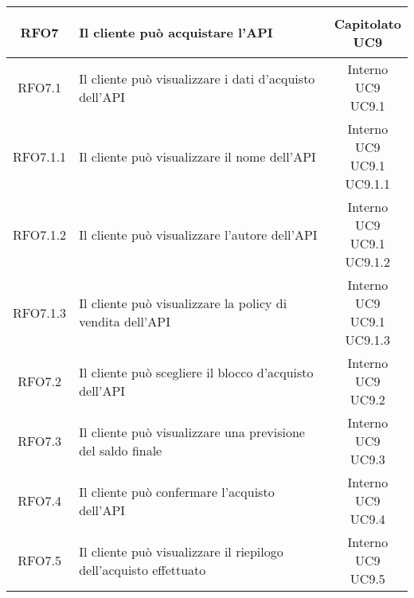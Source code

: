 \begin{longtable}{|c|p{8cm}|c|}
\hypertarget{RFO7}{RFO7} & Il cliente può acquistare l'API & \makecell*{Capitolato\\UC9} \\
\hline

\hypertarget{RFO7.1}{RFO7.1} & Il cliente può visualizzare i dati d'acquisto dell'API & \makecell*{Interno\\UC9\\UC9.1} \\
\hline

\hypertarget{RFO7.1.1}{RFO7.1.1} & Il cliente può visualizzare il nome dell'API & \makecell*{Interno\\UC9\\UC9.1\\UC9.1.1} \\
\hline
\hypertarget{RFO7.1.2}{RFO7.1.2} & Il cliente può visualizzare l'autore dell'API & \makecell*{Interno\\UC9\\UC9.1\\UC9.1.2} \\
\hline
\hypertarget{RFO7.1.3}{RFO7.1.3} & Il cliente può visualizzare la policy di vendita dell'API & \makecell*{Interno\\UC9\\UC9.1\\UC9.1.3} \\
\hline

\hypertarget{RFO7.2}{RFO7.2} & Il cliente può scegliere il blocco d'acquisto dell'API & \makecell*{Interno\\UC9\\UC9.2} \\
\hline
\hypertarget{RFO7.3}{RFO7.3} & Il cliente può visualizzare una previsione del saldo finale & \makecell*{Interno\\UC9\\UC9.3} \\
\hline

\hypertarget{RFO7.4}{RFO7.4} & Il cliente può confermare l'acquisto dell'API & \makecell*{Interno\\UC9\\UC9.4} \\
\hline

\hypertarget{RFO7.5}{RFO7.5} & Il cliente può visualizzare il riepilogo dell'acquisto effettuato & \makecell*{Interno\\UC9\\UC9.5} \\
\hline


\end{longtable}
